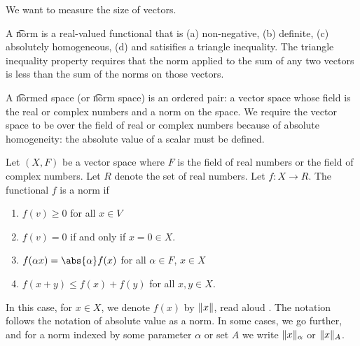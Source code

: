 
We want to measure the size of vectors.


A \t{norm} is a real-valued functional that is
(a) non-negative,
(b) definite,
(c) absolutely homogeneous,
(d) and satisifies a triangle inequality.
The triangle inequality property requires that the norm applied to the sum of any two vectors is less than the sum of the norms on those vectors.

A \t{normed space} (or \t{norm space}) is an ordered pair: a vector space whose field is the real or complex numbers and a norm on the space.
We require the vector space to be over the field of real or complex numbers because of absolute homogeneity: the absolute value of a scalar must be defined.


Let $(X, F)$ be a vector space where $F$ is the field of real numbers or the field of complex numbers.
Let $R$ denote the set of real numbers.
Let $f: X \to R$.
The functional $f$ is a norm if
  \begin{enumerate}
  \item $f(v) \geq 0$ for all $x \in V$
  \item $f(v) = 0$ if and only if $x = 0 \in X$.
  \item $f(\alpha x) = \abs{\alpha}f(x)$ for all $\alpha \in F$, $x \in X$
  \item $f(x + y) \leq f(x) + f(y)$ for all $x, y \in X$.
  \end{enumerate}

In this case, for $x \in X$, we denote $f(x)$ by $\lVert x\rVert$, read aloud .
The notation follows the notation of absolute value as a norm.
In some cases, we go further, and for a norm indexed by some parameter $\alpha$ or set $A$ we write $\lVert x\rVert_\alpha$ or $\lVert x\rVert_A$.
